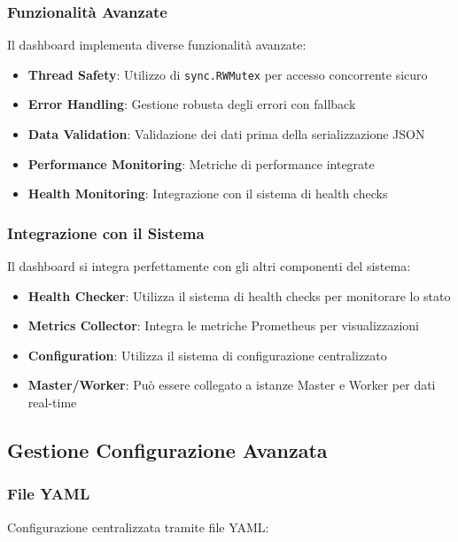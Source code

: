 \documentclass[12pt,a4paper]{article}
\begin{document}
\subsubsection{Funzionalità Avanzate}

Il dashboard implementa diverse funzionalità avanzate:

\begin{itemize}
\item \textbf{Thread Safety}: Utilizzo di \texttt{sync.RWMutex} per accesso concorrente sicuro
\item \textbf{Error Handling}: Gestione robusta degli errori con fallback
\item \textbf{Data Validation}: Validazione dei dati prima della serializzazione JSON
\item \textbf{Performance Monitoring}: Metriche di performance integrate
\item \textbf{Health Monitoring}: Integrazione con il sistema di health checks
\end{itemize}

\subsubsection{Integrazione con il Sistema}

Il dashboard si integra perfettamente con gli altri componenti del sistema:

\begin{itemize}
\item \textbf{Health Checker}: Utilizza il sistema di health checks per monitorare lo stato
\item \textbf{Metrics Collector}: Integra le metriche Prometheus per visualizzazioni
\item \textbf{Configuration}: Utilizza il sistema di configurazione centralizzato
\item \textbf{Master/Worker}: Può essere collegato a istanze Master e Worker per dati real-time
\end{itemize}

\subsection{Gestione Configurazione Avanzata}

\subsubsection{File YAML}

Configurazione centralizzata tramite file YAML:
\end{document}
